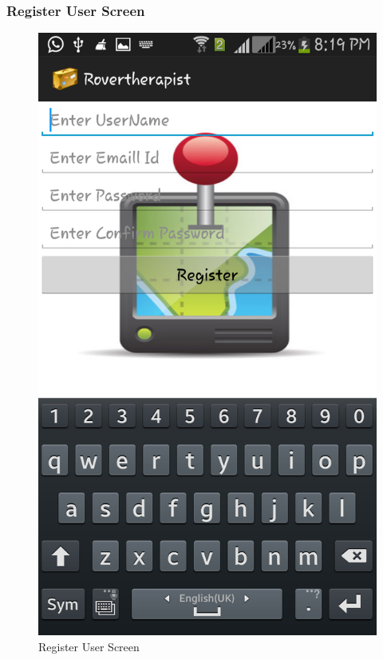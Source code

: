 \documentclass[12pt,a4paper]{article}
\begin{document}
\subsubsection{Register User Screen}
\begin{figure}[!htb]
\centering
\includegraphics[width=12 cm]{register}
\caption{Register User Screen}
\end{figure}
\\
\end{document}
